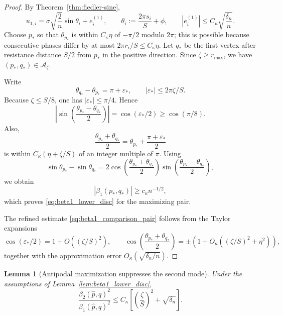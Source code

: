 \documentclass[11pt]{article}
\numberwithin{equation}{section}
\newtheorem{lemma}[theorem]{Lemma}
\theoremstyle{definition}
\theoremstyle{remark}
\begin{document}
\begin{proof}
	By Theorem~\ref{thm:fiedler-sine},
	\[
	u_{1,i}=
	\sigma\sqrt{\frac2n}\sin\theta_i+e_i^{(1)},
	\qquad
	\theta_i:=\frac{2\pi s_i}{S}+\phi,
	\qquad
	|e_i^{(1)}|\le C_\kappa\sqrt{\frac{\delta_n}{n}}.
	\]
	Choose $p_*$ so that $\theta_{p_*}$ is within $C_\kappa\eta$ of
	$-\pi/2$ modulo $2\pi$; this is possible because consecutive phases
	differ by at most $2\pi r_i/S\le C_\kappa\eta$. Let $q_*$ be the first
	vertex after resistance distance $S/2$ from $p_*$ in the positive
	direction. Since $\zeta\ge r_{\max}$, we have $(p_*,q_*)\in\mathcal A_\zeta$.
	
	Write
	\[
	\theta_{q_*}-\theta_{p_*}=\pi+\varepsilon_*,
	\qquad
	|\varepsilon_*|\le 2\pi\zeta/S.
	\]
	Because $\zeta\le S/8$, one has $|\varepsilon_*|\le \pi/4$. Hence
	\[
	\left|
	\sin\left(\frac{\theta_{p_*}-\theta_{q_*}}2\right)
	\right|
	=
	\cos(\varepsilon_*/2)
	\ge \cos(\pi/8).
	\]
	Also,
	\[
	\frac{\theta_{p_*}+\theta_{q_*}}2
	=
	\theta_{p_*}+\frac{\pi+\varepsilon_*}{2}
	\]
	is within $C_\kappa(\eta+\zeta/S)$ of an integer multiple of $\pi$.
	Using
	\[
	\sin\theta_{p_*}-\sin\theta_{q_*}
	=
	2\cos\left(\frac{\theta_{p_*}+\theta_{q_*}}2\right)
	\sin\left(\frac{\theta_{p_*}-\theta_{q_*}}2\right),
	\]
	we obtain
	\[
	|\beta_1(p_*,q_*)|\ge c_\kappa n^{-1/2},
	\]
	which proves \eqref{eq:beta1_lower_disc} for the maximizing pair.
	
	The refined estimate \eqref{eq:beta1_comparison_pair} follows from the
	Taylor expansions
	\[
	\cos(\varepsilon_*/2)=1+O\left((\zeta/S)^2\right),
	\qquad
	\cos\left(\frac{\theta_{p_*}+\theta_{q_*}}2\right)
	=
	\pm\left(1+O_\kappa((\zeta/S)^2+\eta^2)\right),
	\]
	together with the approximation error
	$O_\kappa(\sqrt{\delta_n/n})$.
\end{proof}

\begin{lemma}[Antipodal maximization suppresses the second mode]\label{lem:beta_ratio_disc}
	Under the assumptions of Lemma~\ref{lem:beta1_lower_disc},
	\begin{equation}\label{eq:beta_ratio_disc}
		\frac{\beta_2(\widehat p,\widehat q)^2}
		{\beta_1(\widehat p,\widehat q)^2}
		\le
		C_\kappa\left[
		\left(\frac{\zeta}{S}\right)^2+\sqrt{\delta_n}
		\right].
	\end{equation}
\end{lemma}
\end{document}
